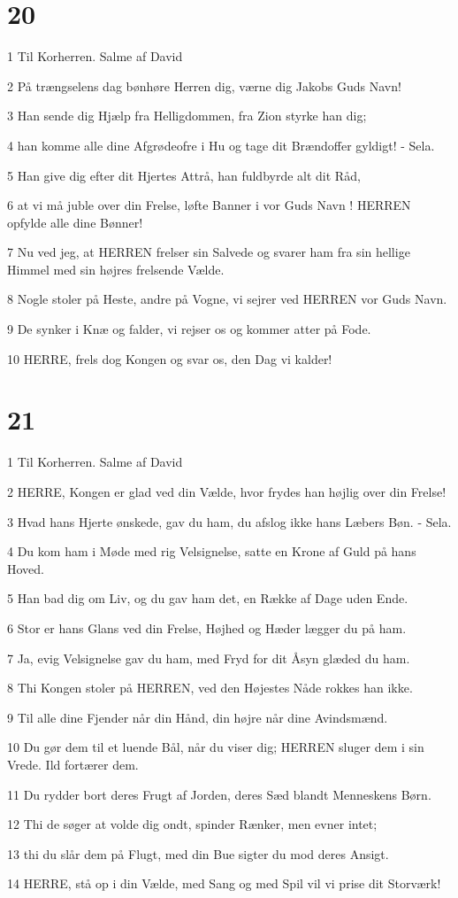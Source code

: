 \chapter{20}

\par 1 Til Korherren. Salme af David
\par 2 På trængselens dag bønhøre Herren dig, værne dig Jakobs Guds Navn!
\par 3 Han sende dig Hjælp fra Helligdommen, fra Zion styrke han dig;
\par 4 han komme alle dine Afgrødeofre i Hu og tage dit Brændoffer gyldigt! - Sela.
\par 5 Han give dig efter dit Hjertes Attrå, han fuldbyrde alt dit Råd,
\par 6 at vi må juble over din Frelse, løfte Banner i vor Guds Navn ! HERREN opfylde alle dine Bønner!
\par 7 Nu ved jeg, at HERREN frelser sin Salvede og svarer ham fra sin hellige Himmel med sin højres frelsende Vælde.
\par 8 Nogle stoler på Heste, andre på Vogne, vi sejrer ved HERREN vor Guds Navn.
\par 9 De synker i Knæ og falder, vi rejser os og kommer atter på Fode.
\par 10 HERRE, frels dog Kongen og svar os, den Dag vi kalder!

\chapter{21}

\par 1 Til Korherren. Salme af David
\par 2 HERRE, Kongen er glad ved din Vælde, hvor frydes han højlig over din Frelse!
\par 3 Hvad hans Hjerte ønskede, gav du ham, du afslog ikke hans Læbers Bøn. - Sela.
\par 4 Du kom ham i Møde med rig Velsignelse, satte en Krone af Guld på hans Hoved.
\par 5 Han bad dig om Liv, og du gav ham det, en Række af Dage uden Ende.
\par 6 Stor er hans Glans ved din Frelse, Højhed og Hæder lægger du på ham.
\par 7 Ja, evig Velsignelse gav du ham, med Fryd for dit Åsyn glæded du ham.
\par 8 Thi Kongen stoler på HERREN, ved den Højestes Nåde rokkes han ikke.
\par 9 Til alle dine Fjender når din Hånd, din højre når dine Avindsmænd.
\par 10 Du gør dem til et luende Bål, når du viser dig; HERREN sluger dem i sin Vrede. Ild fortærer dem.
\par 11 Du rydder bort deres Frugt af Jorden, deres Sæd blandt Menneskens Børn.
\par 12 Thi de søger at volde dig ondt, spinder Rænker, men evner intet;
\par 13 thi du slår dem på Flugt, med din Bue sigter du mod deres Ansigt.
\par 14 HERRE, stå op i din Vælde, med Sang og med Spil vil vi prise dit Storværk!

